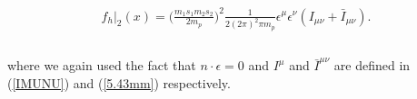 \begin{equation}\label{ch2:e:grav-waveform}
\begin{split}
 f_{h}\Big|_{2}(x)=\Big(\frac{m_1 s_1 m_2 s_2}{2m_p}\Big)^2\frac{1}{2(2\pi)^2 \pi m_p }\epsilon^{\mu}\epsilon^{\nu}(I_{\mu\nu}+\bar I_{\mu\nu}).
\\
        \end{split}
\end{equation}\\
where we again used the fact that $n\cdot \epsilon=0$ and $I^{\mu}$ and $\bar{I}^{\mu\nu}$ are defined in (\ref{IMUNU}) and (\ref{5.43mm}) respectively.
